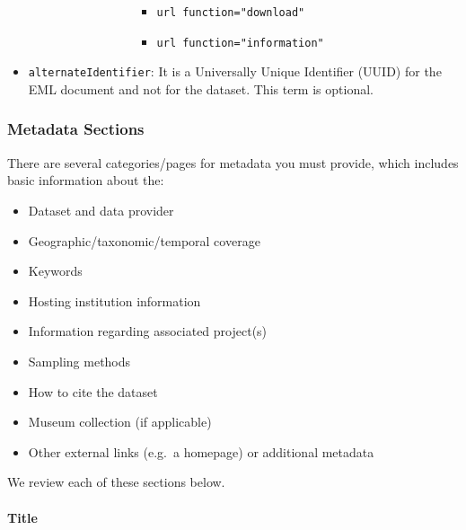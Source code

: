 \documentclass[
  letterpaper,
  DIV=11,
  numbers=noendperiod,
  oneside]{scrreprt}
\let\oldparagraph\paragraph
\renewcommand{\paragraph}[1]{\oldparagraph{#1}\mbox{}}
\providecommand{\tightlist}{%
  \setlength{\itemsep}{0pt}\setlength{\parskip}{0pt}}\usepackage{longtable,booktabs,array}
\begin{document}
\begin{itemize}
\begin{itemize}
\begin{itemize}
\begin{itemize}
\begin{itemize}
\begin{itemize}
            \begin{itemize}
            \tightlist
            \item
              \texttt{url\ function="download"}
            \item
              \texttt{url\ function="information"}
            \end{itemize}
          \end{itemize}
        \end{itemize}
      \end{itemize}
    \end{itemize}
  \end{itemize}
\item
  \texttt{alternateIdentifier}: It is a Universally Unique Identifier
  (UUID) for the EML document and not for the dataset. This term is
  optional.
\end{itemize}

\hypertarget{metadata-sections}{%
\subsubsection{Metadata Sections}\label{metadata-sections}}

There are several categories/pages for metadata you must provide, which
includes basic information about the:

\begin{itemize}
\tightlist
\item
  Dataset and data provider
\item
  Geographic/taxonomic/temporal coverage
\item
  Keywords
\item
  Hosting institution information
\item
  Information regarding associated project(s)
\item
  Sampling methods
\item
  How to cite the dataset
\item
  Museum collection (if applicable)
\item
  Other external links (e.g.~a homepage) or additional metadata
\end{itemize}

We review each of these sections below.

\hypertarget{title}{%
\paragraph{Title}\label{title}}
\end{document}
